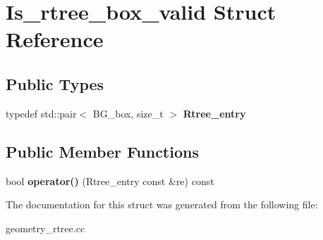 \hypertarget{structIs__rtree__box__valid}{}\section{Is\+\_\+rtree\+\_\+box\+\_\+valid Struct Reference}
\label{structIs__rtree__box__valid}
\subsection*{Public Types}
\begin{DoxyCompactItemize}
\item 
\mbox{\label{structIs__rtree__box__valid_aca41a1736cdd452ef480f9b7ad4f3c98}} 
typedef std\+::pair$<$ B\+G\+\_\+box, size\+\_\+t $>$ {\bfseries Rtree\+\_\+entry}
\end{DoxyCompactItemize}
\subsection*{Public Member Functions}
\begin{DoxyCompactItemize}
\item 
\mbox{\label{structIs__rtree__box__valid_a855ea5a1fa2ff89a2b6ffb35a35376b4}} 
bool {\bfseries operator()} (Rtree\+\_\+entry const \&re) const
\end{DoxyCompactItemize}


The documentation for this struct was generated from the following file\+:\begin{DoxyCompactItemize}
\item 
geometry\+\_\+rtree.\+cc\end{DoxyCompactItemize}
